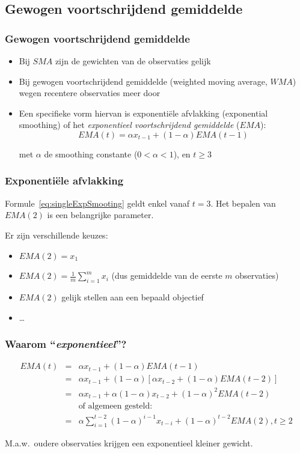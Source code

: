 \documentclass{beamer}
\begin{document}
\subsection{Gewogen voortschrijdend gemiddelde}

\begin{frame}
  \frametitle{Gewogen voortschrijdend gemiddelde}

  \begin{itemize}
    \item Bij $SMA$ zijn de gewichten van de observaties gelijk
    \item Bij gewogen voortschrijdend gemiddelde (weighted moving average, $WMA$) wegen recentere observaties meer door
    \item Een specifieke vorm hiervan is exponentiële afvlakking (exponential smoothing) of het \emph{exponentieel voortschrijdend gemiddelde} ($EMA$):
      \begin{equation}
        EMA(t) = \alpha x_{t-1} + (1-\alpha) EMA(t-1)
        \label{eq:singleExpSmooting}
      \end{equation}

      met $\alpha$ de smoothing constante ($0 < \alpha < 1$), en $t \geq 3$
  \end{itemize}
\end{frame}

\begin{frame}
  \frametitle{Exponentiële afvlakking}

  Formule~\ref{eq:singleExpSmooting} geldt enkel vanaf $t=3$. Het bepalen van $EMA(2)$ is een belangrijke parameter.

  Er zijn verschillende keuzes:

  \begin{itemize}
    \item $EMA(2) = x_1$
    \item $EMA(2) = \frac{1}{m} \sum_{i=1}^{m} x_i$ (dus gemiddelde van de eerste $m$ observaties)
    \item $EMA(2)$ gelijk stellen aan een bepaald objectief
    \item \ldots
  \end{itemize}
\end{frame}

\begin{frame}
  \frametitle{Waarom ``\emph{exponentieel}''?}

  \begin{eqnarray*}
    EMA(t) & = & \alpha x_{t-1} + (1-\alpha) EMA(t-1)                                           \\
           & = & \alpha x_{t-1} + (1-\alpha)\left[\alpha x_{t-2} + (1-\alpha)EMA(t - 2)\right]  \\
           & = & \alpha x_{t-1} + \alpha (1-\alpha)x_{t-2} + (1-\alpha)^{2} EMA(t - 2)          \\
           &   & \text{of algemeen gesteld:} \\
           & = & \alpha \sum_{i=1}^{t-2}(1-\alpha)^{i-1}x_{t-i} + (1-\alpha)^{t-2} EMA(2), t \geq 2
  \end{eqnarray*}

  M.a.w.~oudere observaties krijgen een exponentieel kleiner gewicht.
\end{frame}
\end{document}
